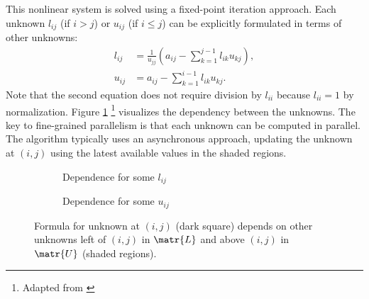 This nonlinear system is solved using a fixed-point iteration approach. Each
unknown \(l_{ij}\) (if \(i>j\)) or \(u_{ij}\) (if \(i \le j\)) can be explicitly
formulated in terms of other unknowns:
\begin{align*}
  l_{ij} &= \frac{1}{u_{jj}} \left(a_{ij} - \sum_{k=1}^{j-1} l_{ik}u_{kj} \right), \\
  u_{ij} &= a_{ij} - \sum_{k=1}^{i-1} l_{ik}u_{kj}.
\end{align*}
Note that the second equation does not require division by \(l_{ii}\) because
\(l_{ii} = 1\) by normalization. Figure \ref{fig:dependence} \footnote{Adapted
  from \cite{chow_fine-grained_2015}} visualizes the dependency between the
unknowns. The key to fine-grained parallelism is that each unknown can be
computed in parallel. The algorithm typically uses an asynchronous approach,
updating the unknown at \((i,j)\) using the latest available values in the
shaded regions.

\begin{figure}[h]
  \centering
  \begin{subfigure}{.4\linewidth}
    \centering
    \caption{Dependence for some \(l_{ij}\)}
  \end{subfigure}
  \begin{subfigure}{.4\linewidth}
    \centering
    \caption{Dependence for some \(u_{ij}\)}
  \end{subfigure}
  \caption[Dependence of ILU unknowns]{Formula for unknown at \((i,j)\) (dark
    square) depends on other unknowns left of \((i,j)\) in \(\matr{L}\) and
    above \((i,j)\) in \(\matr{U}\) (shaded regions).}
  \label{fig:dependence}
\end{figure}
